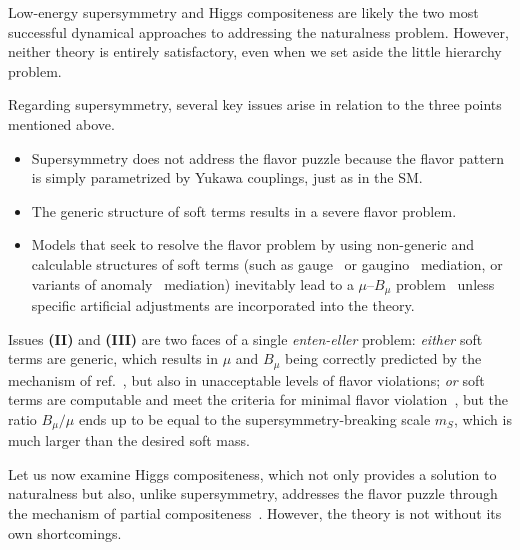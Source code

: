 \documentclass[a4paper,12pt]{article}
\def\mS{m_S}
\begin{document}
Low-energy supersymmetry and Higgs compositeness are likely the two most successful dynamical approaches to addressing the naturalness problem. However, neither theory is entirely satisfactory, even when we set aside the little hierarchy problem.

Regarding supersymmetry, several key issues arise in relation to the three points mentioned above.

\begin{itemize}

\item[\textbf{(I)}] Supersymmetry does not address the flavor puzzle because the flavor pattern is simply parametrized by Yukawa couplings, just as in the SM. 

\item[\textbf{(II)}] The generic structure of soft terms results in a severe flavor problem.

\item[\textbf{(III)}] Models that seek to resolve the flavor problem by using non-generic and calculable structures of soft terms (such as gauge~\cite{Dine:1993yw,Dine:1994vc,Dine:1995ag,Giudice:1998bp} or gaugino~\cite{Kaplan:1999ac,Chacko:1999mi} mediation, or variants of anomaly~\cite{Randall:1998uk,Giudice:1998xp} mediation) inevitably lead to a $\mu$--$B_\mu$ problem~\cite{Dvali:1996cu} unless specific artificial adjustments are incorporated into the theory. 
\end{itemize}

Issues \textbf{(II)} and \textbf{(III)} are two faces of a single {\it enten-eller} problem: {\it either} soft terms are generic, which results in $\mu$ and $B_\mu$ being correctly predicted by the mechanism of ref.~\cite{Giudice:1988yz}, but also in unacceptable levels of flavor violations; {\it or} soft terms are computable and meet the criteria for minimal flavor violation~\cite{DAmbrosio:2002vsn}, but the ratio $B_\mu/\mu$ ends up to be equal to the supersymmetry-breaking scale $\mS$, which is much larger than the desired soft mass.

\medskip

Let us now examine Higgs compositeness, which not only provides a solution to naturalness but also, unlike supersymmetry, addresses the flavor puzzle through the mechanism of partial compositeness~\cite{Kaplan:1991dc}. However, the theory is not without its own shortcomings.
\end{document}

